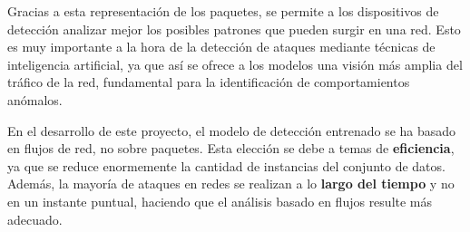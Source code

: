 Gracias a esta representación de los paquetes, se permite a los dispositivos de detección analizar mejor los posibles patrones que pueden surgir en una red. Esto es muy importante a la hora de la detección de ataques mediante técnicas de inteligencia artificial, ya que así se ofrece a los modelos una visión más amplia del tráfico de la red, fundamental para la identificación de comportamientos anómalos.

En el desarrollo de este proyecto, el modelo de detección entrenado se ha basado en flujos de red, no sobre paquetes. Esta elección se debe a temas de \textbf{eficiencia}, ya que se reduce enormemente la cantidad de instancias del conjunto de datos. Además, la mayoría de ataques en redes se realizan a lo \textbf{largo del tiempo} y no en un instante puntual, haciendo que el análisis basado en flujos resulte más adecuado.
